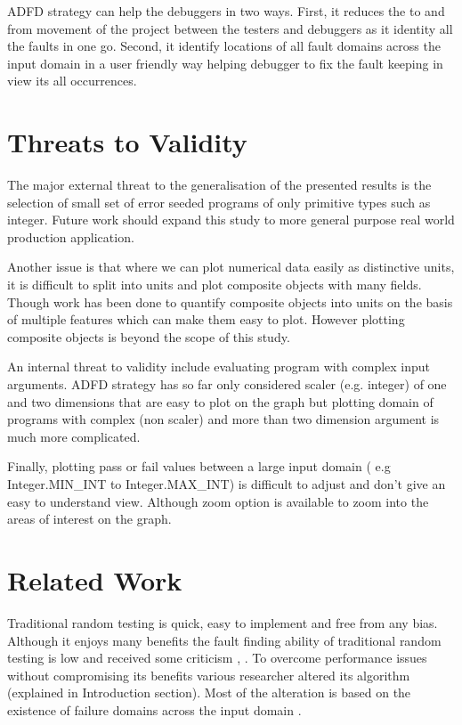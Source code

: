 \documentclass[runningheads,a4paper]{llncs}
\begin{document}
ADFD strategy can help the debuggers in two ways. First, it reduces the to and from movement of the project between the testers and debuggers as it identity all the faults in one go. Second, it identify locations of all fault domains across the input domain in a user friendly way helping debugger to fix the fault keeping in view its all occurrences.


\section{Threats to Validity} \label{sec:validity}
The major external threat to the generalisation of the presented results is the selection of small set of error seeded programs of only primitive types such as integer. Future work should expand this study to more general purpose real world production application.

Another issue is that where we can plot numerical data easily as distinctive units, it is difficult to split into units and plot composite objects with many fields. Though work has been done to quantify composite objects into units on the basis of multiple features \cite{Ciupa2006} which can make them easy to plot. However plotting composite objects is beyond the scope of this study.

An internal threat to validity include evaluating program with complex input arguments. ADFD strategy has so far only considered scaler (e.g. integer) of one and two dimensions that are easy to plot on the graph but plotting domain of programs with complex (non scaler) and more than two dimension argument is much more complicated.

Finally, plotting pass or fail values between a large input domain ( e.g Integer.MIN\_INT to Integer.MAX\_INT) is difficult to adjust and don't give an easy to understand view. Although zoom option is available to zoom into the areas of interest on the graph. 



\section{Related Work} \label{sec:relatedWork}
Traditional random testing is quick, easy to implement and free from any bias. Although it enjoys many benefits the fault finding ability of traditional random testing is low and received some criticism \cite{Myers2011},  \cite{Offutt1996}. To overcome performance issues without compromising its benefits various researcher altered its algorithm (explained in Introduction section). Most of the alteration is based on the existence of failure domains across the input domain \cite{Chan1996}. 
\end{document}
